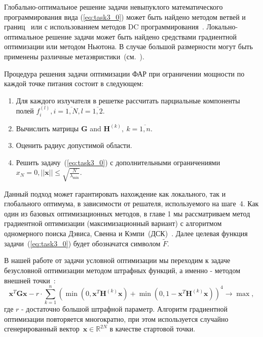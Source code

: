 Глобально-оптимальное решение задачи невыпуклого математического программирования вида (\ref{eq:task3_0}) может быть найдено методом
ветвей и границ~ или с использованием методов DC программирования~. Локально-оптимальное решение задачи может быть найдено средствами градиентной оптимизации или методом Ньютона. В случае большой размерности могут быть применены различные метаэвристики~(см.~).

Процедура решения задачи оптимизации ФАР при ограничении мощности по каждой точке питания состоит в следующем:
%
\begin{enumerate}
  \item Для каждого излучателя в решетке рассчитать парциальные компоненты полей $f_i^{(l)}, i= \overline{1,N}, l=\overline{1,2}$.
  \item Вычислить матрицы $\textbf{G}$ and ${\textbf{H}}^{(k)},\ k=\overline{1,n}$.
  \item Оценить радиус допустимой области.
  \item Решить задачу~(\ref{eq:task3_0}) с дополнительными ограничениями $x_N = 0, ||\textbf{x}||\le \sqrt{\frac{N}{\lambda_{\min}}}$.
\end{enumerate}

Данный подход может гарантировать нахождение как локального, так и глобального оптимума, в зависимости от решателя, используемого на шаге~4. Как один из базовых оптимизационных методов, в главе 1 мы рассматриваем метод градиентной оптимизации (максимизационный вариант)
с алгоритмом одномерного поиска Дэвиса, Свенна и Кэмпи~(ДСК)~. Далее целевая функция задачи~(\ref{eq:task3_0}) будет обозначатся символом $\tilde{F}$.

В нашей работе от задачи условной оптимизации мы переходим к задаче безусловной оптимизации методом штрафных функций, а именно -
методом внешней точки~:
\begin{equation}
       \textbf{x}^{T}\textbf{Gx} - r\cdot \sum_{k=1}^n
       \left( \min\left(0,\textbf{x}^{T}\textbf{H}^{(k)}\textbf{x}\right) +
       \min\left(0,1-\textbf{x}^{T}\textbf{H}^{(k)}\textbf{x}\right)\right)^4 \rightarrow
       \max,
     \label{eq:task4}
\end{equation}
где $r$ - достаточно большой штрафной параметр. Алгоритм градиентной оптимизации повторяется многократно, при этом используется случайно сгенерированный вектор~$\textbf{x}\in \mathbb{R}^{2N}$ в качестве стартовой точки.

